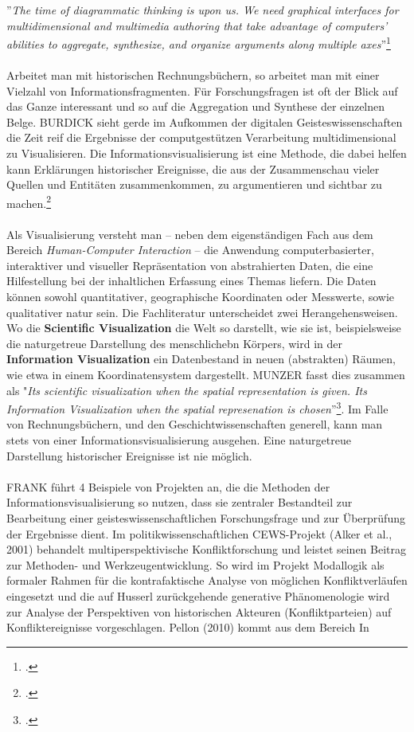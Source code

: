 \documentclass[12pt,a4paper]{article}
\begin{document}
''\textit{The time of diagrammatic thinking is upon us. We need graphical interfaces for multidimensional and multimedia authoring that take advantage of computers’ abilities to aggregate, synthesize, and organize arguments along multiple axes}''\footcite[][S.119]{burdick2012digital_humanities}
\\
\\
Arbeitet man mit historischen Rechnungsbüchern, so arbeitet man mit einer Vielzahl von Informationsfragmenten. Für Forschungsfragen ist oft der Blick auf das Ganze interessant und so auf die Aggregation und Synthese der einzelnen Belge. BURDICK sieht gerde im Aufkommen der digitalen Geisteswissenschaften die Zeit reif die Ergebnisse der computgestützen Verarbeitung multidimensional zu Visualisieren. Die Informationsvisualisierung ist eine Methode, die dabei helfen kann Erklärungen historischer Ereignisse, die aus der Zusammenschau vieler Quellen und Entitäten zusammenkommen, zu argumentieren und sichtbar zu machen.\footcite[][S.3-5]{frank2018visualisierungswerkzeuge}
\\
\\
Als Visualisierung versteht man -- neben dem eigenständigen Fach aus dem Bereich \textit{Human-Computer Interaction} -- die Anwendung computerbasierter, interaktiver und visueller Repräsentation von abstrahierten Daten, die eine Hilfestellung bei der inhaltlichen Erfassung eines Themas liefern. Die Daten können sowohl quantitativer, geographische Koordinaten oder Messwerte, sowie qualitativer natur sein. Die Fachliteratur unterscheidet zwei Herangehensweisen. Wo die \textbf{Scientific Visualization} die Welt so darstellt, wie sie ist, beispielsweise die naturgetreue Darstellung des menschlichebn Körpers, wird in der \textbf{Information Visualization} ein Datenbestand in neuen (abstrakten) Räumen,  wie etwa in einem Koordinatensystem dargestellt. MUNZER fasst dies zusammen als "\textit{Its scientific visualization when the spatial representation is given. Its Information Visualization when the spatial represenation is chosen}''\footcite[][S.134-153)]{munzner2008process}. Im Falle von Rechnungsbüchern, und den Geschichtwissenschaften generell, kann man stets von einer Informationsvisualisierung ausgehen. Eine naturgetreue Darstellung historischer Ereignisse ist nie möglich.
\\
\\
FRANK führt 4 Beispiele von Projekten an, die die Methoden der Informationsvisualisierung so nutzen, dass sie zentraler Bestandteil zur Bearbeitung einer geisteswissenschaftlichen Forschungsfrage  und zur Überprüfung der Ergebnisse dient. Im politikwissenschaftlichen CEWS-Projekt (Alker et al., 2001) behandelt multiperspektivische Konfliktforschung und leistet seinen Beitrag zur Methoden- und Werkzeugentwicklung. So wird im Projekt Modallogik als formaler Rahmen für die kontrafaktische Analyse von möglichen Konfliktverläufen eingesetzt und die auf Husserl zurückgehende generative Phänomenologie wird zur Analyse der Perspektiven von historischen Akteuren (Konfliktparteien) auf Konfliktereignisse vorgeschlagen. Pellon (2010) kommt aus dem Bereich In
\end{document}
